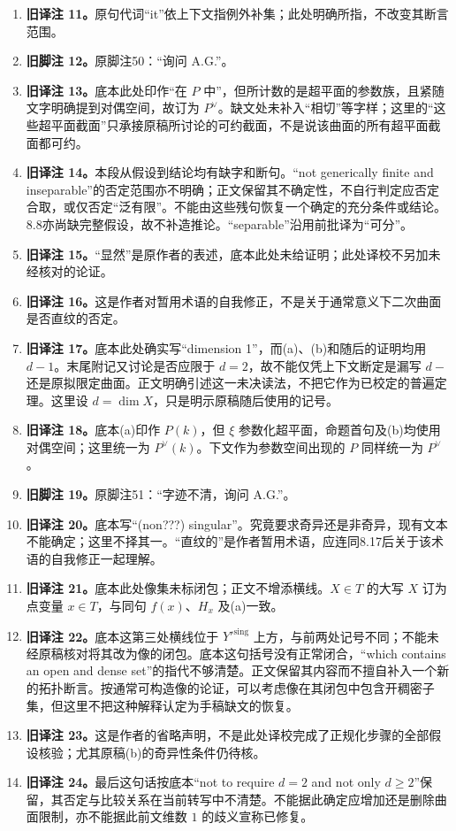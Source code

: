 \documentclass[UTF8,a4paper]{ctexbook}
\begin{document}
\begin{enumerate}
\item \textbf{旧译注 11。}原句代词“it”依上下文指例外补集；此处明确所指，不改变其断言范围。
\item \textbf{旧脚注 12。}原脚注50：“询问 A.G.”。
\item \textbf{旧译注 13。}底本此处印作“在 $P$ 中”，但所计数的是超平面的参数族，且紧随文字明确提到对偶空间，故订为 $P^\vee$。缺文处未补入“相切”等字样；这里的“这些超平面截面”只承接原稿所讨论的可约截面，不是说该曲面的所有超平面截面都可约。
\item \textbf{旧译注 14。}本段从假设到结论均有缺字和断句。“not generically finite and inseparable”的否定范围亦不明确；正文保留其不确定性，不自行判定应否定合取，或仅否定“泛有限”。不能由这些残句恢复一个确定的充分条件或结论。8.8亦尚缺完整假设，故不补造推论。“separable”沿用前批译为“可分”。
\item \textbf{旧译注 15。}“显然”是原作者的表述，底本此处未给证明；此处译校不另加未经核对的论证。
\item \textbf{旧译注 16。}这是作者对暂用术语的自我修正，不是关于通常意义下二次曲面是否直纹的否定。
\item \textbf{旧译注 17。}底本此处确实写“dimension 1”，而(a)、(b)和随后的证明均用 $d-1$。末尾附记又讨论是否应限于 $d=2$，故不能仅凭上下文断定是漏写 $d-$ 还是原拟限定曲面。正文明确引述这一未决读法，不把它作为已校定的普遍定理。这里设 $d=\dim X$，只是明示原稿随后使用的记号。
\item \textbf{旧译注 18。}底本(a)印作 $P(k)$，但 $\xi$ 参数化超平面，命题首句及(b)均使用对偶空间；这里统一为 $P^\vee(k)$。下文作为参数空间出现的 $P$ 同样统一为 $P^\vee$。
\item \textbf{旧脚注 19。}原脚注51：“字迹不清，询问 A.G.”。
\item \textbf{旧译注 20。}底本写“(non???) singular”。究竟要求奇异还是非奇异，现有文本不能确定；这里不择其一。“直纹的”是作者暂用术语，应连同8.17后关于该术语的自我修正一起理解。
\item \textbf{旧译注 21。}底本此处像集未标闭包；正文不增添横线。$X\in T$ 的大写 $X$ 订为点变量 $x\in T$，与同句 $f(x)$、$H_x$ 及(a)一致。
\item \textbf{旧译注 22。}底本这第三处横线位于 $Y'^{\mathrm{sing}}$ 上方，与前两处记号不同；不能未经原稿核对将其改为像的闭包。底本这句括号没有正常闭合，“which contains an open and dense set”的指代不够清楚。正文保留其内容而不擅自补入一个新的拓扑断言。按通常可构造像的论证，可以考虑像在其闭包中包含开稠密子集，但这里不把这种解释认定为手稿缺文的恢复。
\item \textbf{旧译注 23。}这是作者的省略声明，不是此处译校完成了正规化步骤的全部假设核验；尤其原稿(b)的奇异性条件仍待核。
\item \textbf{旧译注 24。}最后这句话按底本“not to require $d=2$ and not only $d\ge2$”保留，其否定与比较关系在当前转写中不清楚。不能据此确定应增加还是删除曲面限制，亦不能据此前文维数 $1$ 的歧义宣称已修复。
\end{enumerate}
\endgroup
\begingroup
\end{document}
